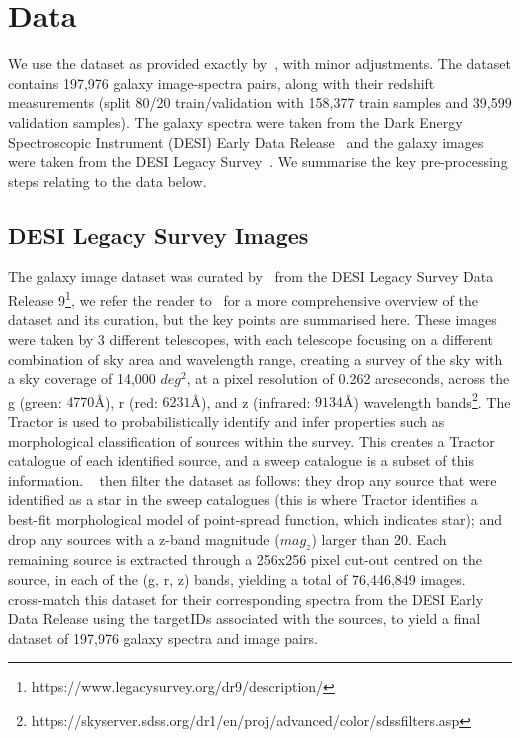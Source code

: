 
\section{Data}\label{sec:data}
We use the dataset as provided exactly by~\cite{astroclip}, with minor adjustments.
The dataset contains 197,976 galaxy image-spectra pairs, along with their redshift measurements (split 80/20 train/validation
with 158,377 train samples and 39,599 validation samples).
The galaxy spectra were taken from the Dark Energy Spectroscopic Instrument (DESI) Early Data Release~\citep{desiearly2023}
and the galaxy images were taken from the DESI Legacy Survey~\citep{desilegacy2018}.
We summarise the key pre-processing steps relating to the data below.

\subsection{DESI Legacy Survey Images}\label{subsec:images}
The galaxy image dataset was curated by~\cite{stein2022} from the DESI Legacy Survey Data Release 9\footnote{https://www.legacysurvey.org/dr9/description/},
we refer the reader to~\cite{stein2022, astroclip} for a more comprehensive overview of the dataset and its curation, but the
key points are summarised here.
These images were taken by 3 different telescopes, with each telescope focusing on a different combination of sky area
and wavelength range, creating a survey of the sky with a sky coverage of 14,000 $deg^{2}$, at a pixel resolution of 0.262 arcseconds,
across the g (green: $4770 \si{\angstrom}$), r (red: $6231 \si{\angstrom}$), and z (infrared: $9134 \si{\angstrom}$) wavelength
bands\footnote{https://skyserver.sdss.org/dr1/en/proj/advanced/color/sdssfilters.asp}.
The Tractor is used to probabilistically identify and infer properties such
as morphological classification of sources within the survey.
This creates a Tractor catalogue of each identified source, and a sweep catalogue is a subset of this information.
~\cite{stein2022} then filter the dataset as follows: they drop any source that were identified as a star in the sweep catalogues
(this is where Tractor identifies a best-fit morphological model of point-spread function, which indicates star); and drop any sources
with a z-band magnitude ($mag_{z}$) larger than 20.
Each remaining source is extracted through a 256x256 pixel cut-out centred on the source, in each of the (g, r, z) bands,
yielding a total of 76,446,849 images.
~\cite{astroclip} cross-match this dataset for their corresponding spectra from the DESI Early Data Release
using the targetIDs associated with the sources, to yield a final dataset of 197,976 galaxy spectra and image pairs.

